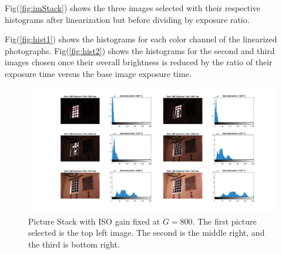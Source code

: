 \documentclass[a4paper]{article}
\begin{document}
Fig(\ref{fig:imStack}) shows the three images selected with their respective histograms after linearization but before dividing by exposure ratio.

Fig(\ref{fig:hist1}) shows the  histograms for each color channel of the linearized photographs.  Fig(\ref{fig:hist2}) shows the histograms for the second and third images chosen once their overall brightness is reduced by the ratio of their exposure time versus the base image exposure time. 

\begin{figure}[H]
\includegraphics[trim=7cm 1cm 1cm 0cm clip, scale=.4]{Chapel_Histogram_set.png}
\caption{Picture Stack with ISO gain fixed at $G = 800$.  The first picture selected is the top left image.  The second is the middle right, and the third is bottom right.}
\label{fig:stack}
\end{figure}
\end{document}
